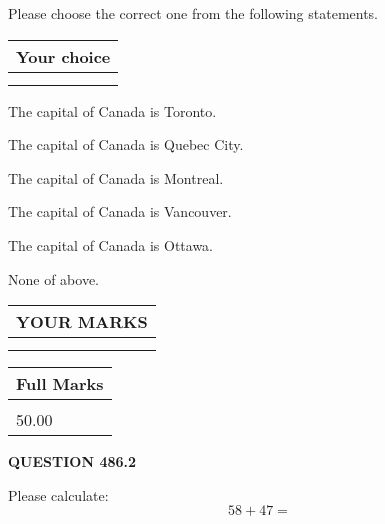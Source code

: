 \documentclass[12pt]{article}
\begin{document}
  
Please choose the correct one from the following statements.
  
  
\noindent\hspace{3.0in} \begin{tabular}{|l|}
\hline
Your choice \\
\hline
 \\ 
 \\ 
\hline
\end{tabular}
  
  
 
 
The capital of Canada is Toronto.
 
 
The capital of Canada is Quebec City.
 
 
The capital of Canada is Montreal.
 
 
The capital of Canada is Vancouver.
 
 
The capital of Canada is Ottawa.
 
 
 None of above.
 
 
  
\vspace{0.2in}
  
\noindent\begin{tabular}{|l|}
\hline
 YOUR MARKS  \\
\hline
 \\ 
 \\ 
\hline
\end{tabular}
\hspace{0.05in} \begin{tabular}{|l|}
\hline
 Full Marks  \\
\hline
 \\ 
50.00 \\
\hline
\end{tabular}
{\textbf{\Large{QUESTION
486.2 
}}}
  
  
 
Please calculate:
\begin{equation}
58 +  %
47 = \nonumber
\end{equation}
 

 

 
   
   
 \vspace{0.2in}
 
   
   
   
   
\end{document}
